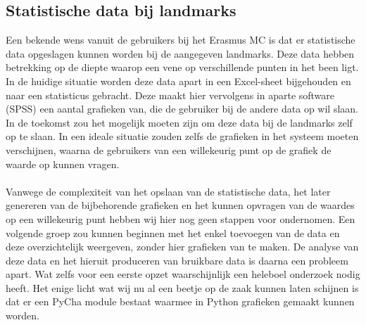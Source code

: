 \subsection{Statistische data bij landmarks} %
Een bekende wens vanuit de gebruikers bij het Erasmus MC is dat er statistische data opgeslagen kunnen worden bij de aangegeven landmarks.
Deze data hebben betrekking op de diepte waarop een vene op verschillende punten in het been ligt.
In de huidige situatie worden deze data apart in een Excel-sheet bijgehouden en naar een statisticus gebracht.
Deze maakt hier vervolgens in aparte software (SPSS)\cite{spss} een aantal grafieken van, die de gebruiker bij de andere data op wil slaan.
In de toekomst zou het mogelijk moeten zijn om deze data bij de landmarks zelf op te slaan.
In een ideale situatie zouden zelfs de grafieken in het systeem moeten verschijnen, waarna de gebruikers van een willekeurig punt op de grafiek de waarde op kunnen vragen.
\\
\\
Vanwege de complexiteit van het opslaan van de statistische data, het later genereren van de bijbehorende grafieken en het kunnen opvragen van de waardes op een willekeurig punt hebben wij hier nog geen stappen voor ondernomen.
Een volgende groep zou kunnen beginnen met het enkel toevoegen van de data en deze overzichtelijk weergeven, zonder hier grafieken van te maken.
De analyse van deze data en het hieruit produceren van bruikbare data is daarna een probleem apart.
Wat zelfs voor een eerste opzet waarschijnlijk een heleboel onderzoek nodig heeft.
Het enige licht wat wij nu al een beetje op de zaak kunnen laten schijnen is dat er een PyCha module bestaat waarmee in Python grafieken gemaakt kunnen worden.

